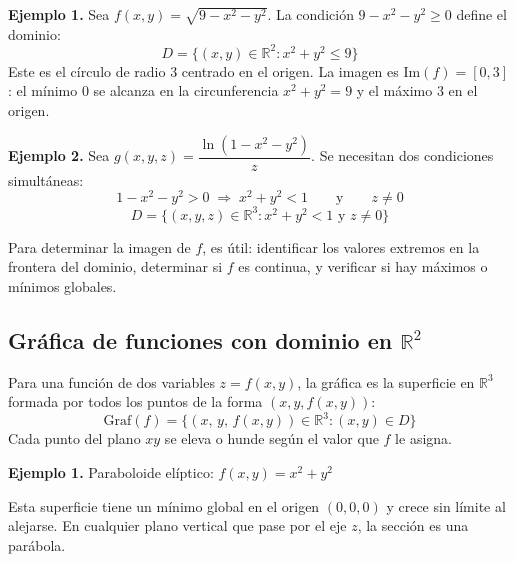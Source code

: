 \textbf{Ejemplo 1.} Sea $f(x,y) = \sqrt{9 - x^2 - y^2}$. La condición $9 - x^2 - y^2 \geq 0$ define el dominio:
\[ D = \{(x,y) \in \mathbb{R}^2 : x^2 + y^2 \leq 9\} \]
Este es el círculo de radio $3$ centrado en el origen. La imagen es $\text{Im}(f) = [0, 3]$: el mínimo $0$ se alcanza en la circunferencia $x^2+y^2=9$ y el máximo $3$ en el origen.

\begin{center}
\shorthandoff{>}
\end{center}

\textbf{Ejemplo 2.} Sea $g(x,y,z) = \dfrac{\ln(1 - x^2 - y^2)}{z}$. Se necesitan dos condiciones simultáneas:
\[
    1 - x^2 - y^2 > 0 \;\Rightarrow\; x^2 + y^2 < 1
    \qquad\text{y}\qquad
    z \neq 0
\]
\[ D = \{(x,y,z) \in \mathbb{R}^3 : x^2 + y^2 < 1 \text{ y } z \neq 0\} \]

Para determinar la imagen de $f$, es útil: identificar los valores extremos en la frontera del dominio, determinar si $f$ es continua, y verificar si hay máximos o mínimos globales.

\subsection{Gráfica de funciones con dominio en $ \mathbb{R}^2 $}

Para una función de dos variables $z = f(x, y)$, la gráfica es la superficie en $\mathbb{R}^3$ formada por todos los puntos de la forma $(x, y, f(x,y))$:
\[ \text{Graf}(f) = \bigl\{(x,\, y,\, f(x,y)) \in \mathbb{R}^3 : (x,y) \in D\bigr\} \]
Cada punto del plano $xy$ se eleva o hunde según el valor que $f$ le asigna.

\textbf{Ejemplo 1.} Paraboloide elíptico: $f(x,y) = x^2 + y^2$

Esta superficie tiene un mínimo global en el origen $(0,0,0)$ y crece sin límite al alejarse. En cualquier plano vertical que pase por el eje $z$, la sección es una parábola.

